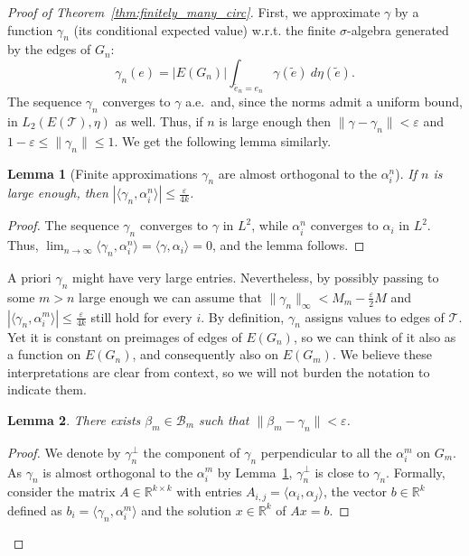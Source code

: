 \documentclass[10pt]{article}
\theoremstyle{plain}
\newtheorem{lemma}{Lemma}[section]
\theoremstyle{remark}
\newcommand{\1}{\mathbbm{1}}
\newcommand{\mcT}{\mathcal{T}}
\numberwithin{equation}{section}
\begin{document}
\begin{proof}[Proof of Theorem~\ref{thm:finitely_many_circ}]
First, we approximate $\gamma$ by a function $\gamma_n$ (its conditional expected value) w.r.t. the finite $\sigma$-algebra generated by the edges of $G_n$:
\[\gamma_n(e) = |E(G_n)| \int_{\tilde{e}_n = e_n} \gamma(\tilde{e}) \ d \eta(\tilde{e}).\] 
The sequence $\gamma_n$ converges to $\gamma$ a.e.\ and, since the norms admit a uniform bound, in $L_2(E(\mcT), \eta)$ as well.
Thus, if $n$ is large enough then $\|\gamma- \gamma_n \| < \varepsilon$ and $1-\varepsilon \leq \|\gamma_n\| \leq 1$. We get the following lemma similarly.

\begin{lemma}[Finite approximations $\gamma_n$ are almost orthogonal to the $\alpha^n_i$] \label{lemma:almost_orthogonal}
    If $n$ is large enough, then $|\langle \gamma_n, \alpha^n_i \rangle | \leq \frac{\varepsilon}{4k}$.
\end{lemma}

\begin{proof}
The sequence $\gamma_n$ converges to $\gamma$ in $L^2$, while $\alpha^n_i$ converges to $\alpha_i$ in $L^2$. Thus, $\lim_{n \to \infty} \langle \gamma_n, \alpha^n_i \rangle = \langle \gamma, \alpha_i \rangle=0$, and the lemma follows.   
\end{proof}

A priori $\gamma_n$ might have very large entries. Nevertheless, by possibly passing to some $m>n$ large enough we can assume that $\|\gamma_n\|_{\infty} < M_m - \frac{\varepsilon}{2} M$  
and $|\langle \gamma_n, \alpha^m_i \rangle | \leq \frac{\varepsilon}{4k}$ still hold for every $i$. By definition,  $\gamma_n$ assigns values to edges of $\mathcal{T}$. Yet it is constant on preimages of edges of $E(G_n)$, so we can think of it also as a function on $E(G_n)$, and consequently also on $E(G_m)$. We believe these interpretations are clear from context, so we will not burden the notation to indicate them.

\begin{lemma}
    There exists $\beta_m \in \mathcal{B}_m$ such that $\|\beta_m - \gamma_n\| <\varepsilon$.
\end{lemma}
\begin{proof}

We denote by $\gamma^{\perp}_n$ the component of $\gamma_n$ perpendicular to all the $\alpha^m_i$ on $G_m$. As $\gamma_n$ is almost orthogonal to the $\alpha^m_i$ by Lemma~\ref{lemma:almost_orthogonal}, $\gamma^{\perp}_n$ is close to $\gamma_n$. Formally, consider the matrix $A \in \mathbb{R}^{k \times k}$ with entries $A_{i,j}=\langle \alpha_i, \alpha_j \rangle$, the vector $b \in \mathbb{R}^k$ defined as $b_i=\langle \gamma_n,\alpha_i^m \rangle$ and the solution $x \in \mathbb{R}^k$ of $Ax=b$.


\end{proof}
\end{proof}
\end{document}
